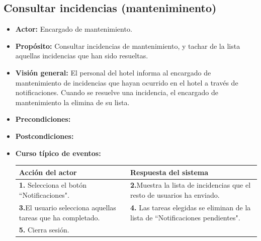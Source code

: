 \documentclass[spanish,a4paper,11pt, twoside]{report}	%
\begin{document}
		\subsection{Consultar incidencias (manteniminento)}
			\begin{itemize}
			\item \textbf{Actor: }Encargado de mantenimiento.
			\item \textbf{Propósito: }Consultar incidencias de mantenimiento, y tachar de la lista aquellas incidencias que han sido resueltas. 
			\item \textbf{Visión general: }El personal del hotel informa al encargado de mantenimiento de incidencias que hayan ocurrido en el hotel a través de notificaciones. Cuando se resuelve una incidencia, el encargado de mantenimiento la elimina de su lista. 
			\item \textbf{Precondiciones:} 
			\item \textbf{Postcondiciones:} 
			\item \textbf{Curso típico de eventos:} \\ 
			\begin{tabular}{|p{6cm}||p{6cm}|}
				\hline
				\textbf{Acción del actor} & \textbf{Respuesta del sistema} \\ \hline \hline
				\textbf{1.} Selecciona el botón “Notificaciones". & \textbf{2.}Muestra la lista de incidencias que el resto de usuarios ha enviado.\\ \hline 
				\textbf{3.}El usuario selecciona aquellas tareas que ha completado. & \textbf{4.} Las tareas elegidas se eliminan de la lista de “Notificaciones pendientes".\\ \hline
				\textbf{5.} Cierra sesión. & \\ \hline
			\end{tabular}
		\end {itemize}
		
		
\end{document}
